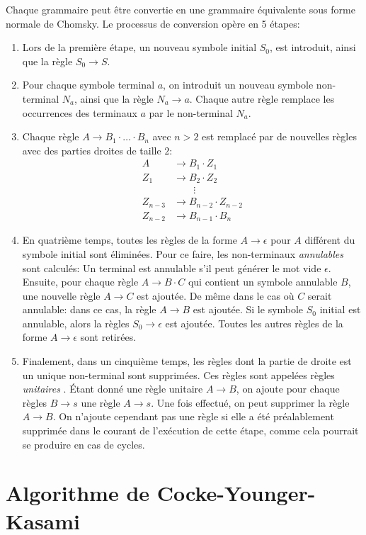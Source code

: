 Chaque grammaire peut être convertie en une grammaire équivalente sous forme normale de Chomsky.
Le processus de conversion opère en 5 étapes:
\begin{enumerate}
\item Lors de la première étape, un nouveau symbole initial $S_0$, est introduit, ainsi que la règle $S_0 \to S$.
\item Pour chaque symbole terminal $a$, on introduit un nouveau symbole non-terminal $N_a$, ainsi que la règle $N_a \to a$.
Chaque autre règle remplace les occurrences des terminaux $a$ par le non-terminal $N_a$.
\item Chaque règle $A \to B_1 \cdot \ldots \cdot B_n$ avec $n > 2$ est remplacé par de nouvelles règles avec des parties droites de taille $2$:
\begin{align*}
A &\to B_1 \cdot Z_1\\
Z_1 &\to B_2 \cdot Z_2\\
&\hspace{2em} \vdots\\
Z_{n - 3} &\to B_{n - 2} \cdot Z_{n - 2}\\
Z_{n - 2} &\to B_{n - 1} \cdot B_n
\end{align*}
\item En quatrième temps, toutes les règles de la forme $A \to \epsilon$ pour $A$ différent du symbole initial sont éliminées.
Pour ce faire, les non-terminaux \og \textit{annulables} \fg{} sont calculés: Un terminal est annulable s'il peut générer le mot vide $\epsilon$.
Ensuite, pour chaque règle $A \to B \cdot C$ qui contient un symbole annulable $B$, une nouvelle règle $A \to C$ est ajoutée.
De même dans le cas où $C$ serait annulable: dans ce cas, la règle $A \to B$ est ajoutée.
Si le symbole $S_0$ initial est annulable, alors la règles $S_0 \to \epsilon$ est ajoutée.
Toutes les autres règles de la forme $A \to \epsilon$ sont retirées.
\item
Finalement, dans un cinquième temps, les règles dont la partie de droite est un unique non-terminal sont supprimées.
Ces règles sont appelées règles \og \textit{unitaires} \fg{}.
Étant donné une règle unitaire $A \to B$, on ajoute pour chaque règles $B \to s$ une règle $A \to s$. Une fois effectué, on peut supprimer la règle $A \to B$. On n'ajoute cependant pas une règle si elle a été préalablement supprimée dans le courant de l'exécution de cette étape, comme cela pourrait se produire en cas de cycles. 	 
\end{enumerate}

\section{Algorithme de Cocke-Younger-Kasami}

